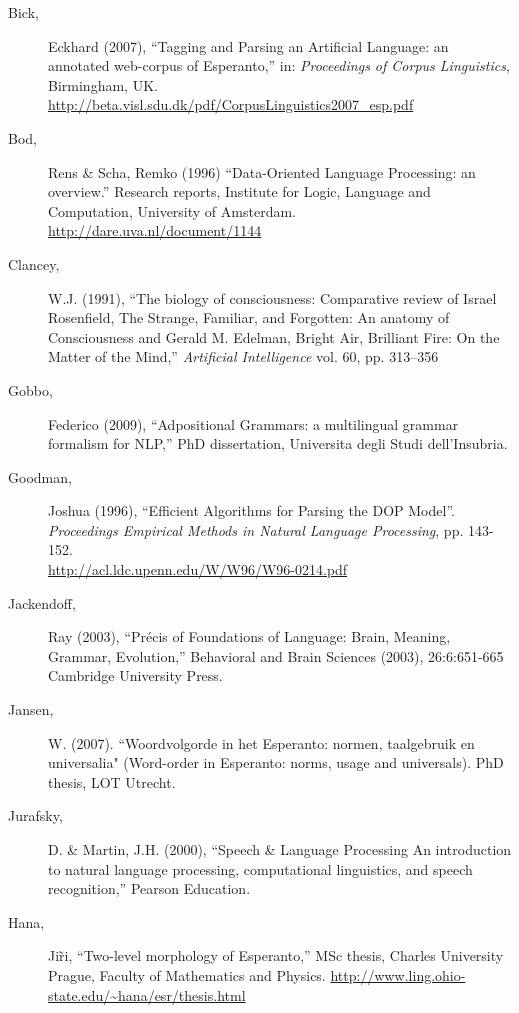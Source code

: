 \documentclass[10pt,a4paper]{article}
\begin{document}
\begin{description}
\item[Bick,] Eckhard (2007), ``Tagging and Parsing an Artificial Language: an
annotated web-corpus of Esperanto,'' in: {\em Proceedings of Corpus
Linguistics}, Birmingham, UK. \\
\url{http://beta.visl.sdu.dk/pdf/CorpusLinguistics2007_esp.pdf}

\item[Bod,] Rens \& Scha, Remko (1996) ``Data-Oriented Language Processing: an
overview.'' Research reports, Institute for Logic, Language and Computation,
University of Amsterdam. \\
\url{http://dare.uva.nl/document/1144}

\item[Clancey,] W.J. (1991), ``The biology of consciousness: Comparative review
of Israel Rosenfield, The Strange, Familiar, and Forgotten: An anatomy of
Consciousness and Gerald M. Edelman, Bright Air, Brilliant Fire: On the Matter
of the Mind,'' {\em Artificial Intelligence} vol. 60, pp. 313--356

\item[Gobbo,] Federico (2009), ``Adpositional Grammars: a multilingual grammar
formalism for NLP,'' PhD dissertation, Universita degli Studi dell'Insubria.

\item[Goodman,] Joshua (1996), ``Efficient Algorithms for Parsing the DOP Model''. {\em Proceedings Empirical Methods in Natural Language Processing}, pp. 143-152. \\
\url{http://acl.ldc.upenn.edu/W/W96/W96-0214.pdf}

\item[Jackendoff,] Ray (2003), ``Précis of Foundations of Language: Brain, Meaning,
Grammar, Evolution,'' Behavioral and Brain Sciences (2003), 26:6:651-665
Cambridge University Press.

\item[Jansen,] W. (2007). ``Woordvolgorde in het Esperanto: normen, taalgebruik en
universalia" (Word-order in Esperanto: norms, usage and universals). PhD
thesis, LOT Utrecht.

\item[Jurafsky,] D. \& Martin, J.H. (2000), ``Speech \& Language Processing An
introduction to natural language processing, computational linguistics, and
speech recognition,'' Pearson Education.

\item[Hana,] Ji\~ri, ``Two-level morphology of Esperanto,'' MSc thesis, Charles University Prague, Faculty of Mathematics and Physics.
\url{http://www.ling.ohio-state.edu/~hana/esr/thesis.html}


\end{description}
\end{document}
